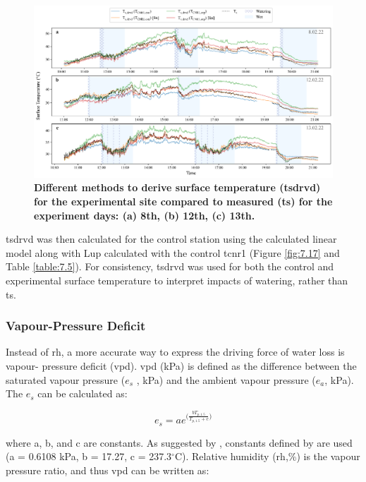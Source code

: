 \documentclass[final,3p,times,authoryear]{elsarticle}
\begin{document}
\begin{figure}
\centering
\includegraphics[trim={0 0 0 0},clip,scale=1.0]{pict027.png}
\caption{\bf Different methods to derive surface temperature (\gls{tsdrvd}) for the experimental site compared to measured (\gls{ts}) for the experiment days: (a) 8th, (b) 12th, (c) 13th.}
 \label{fig:7.8}
\end{figure}

\gls{tsdrvd} was then calculated for the control station using the calculated linear model along with \gls{Lup} calculated with the control \gls{tcnr1} (Figure \ref{fig:7.17} and Table \ref{table:7.5}). For consistency, \gls{tsdrvd} was used for both the control and experimental surface temperature to interpret impacts of watering, rather than \gls{ts}.

\subsubsection{Vapour-Pressure Deficit}\label{sec:appendix7.4.3}

Instead of \gls{rh}, a more accurate way to express the driving force of water loss is vapour-
pressure deficit (\gls{vpd}). \gls{vpd} (kPa) is defined as the difference between the saturated
vapour pressure ($e_{s}$ , kPa) and the ambient vapour pressure ($e_{a}$, kPa).
The $e_{s}$ can be calculated as:

\begin{equation}
e_{s} = a e^{\bigg(  \frac{  bT_{p,1.5}   }{ T_{p,1.5} + c }    \bigg)}
\label{eq:7.7}
\end{equation}

where a, b, and c are constants. As suggested by \cite{McMahon2013}, constants defined by \cite{Allen1998} are used (a = 0.6108 kPa, b = 17.27, c = 237.3$^{\circ}$C). Relative humidity (\gls{rh},\%) is the vapour pressure ratio, and thus \gls{vpd} can be written as:
\end{document}
